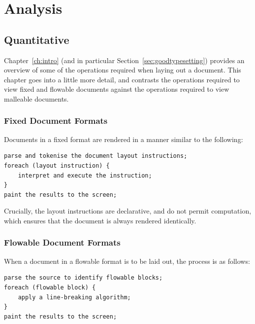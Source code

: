 \chapter{Analysis}\label{ch:analysis}



\section{Quantitative}

Chapter~\ref{ch:intro} (and in particular Section~\ref{sec:goodtypesetting}) provides an overview of some of the operations required when laying out a document. This chapter goes into a little more detail, and contrasts the operations required to view fixed and flowable documents against the operations required to view malleable documents.

\subsection{Fixed Document Formats}
Documents in a fixed format are rendered in a manner similar to the following:
{\singlespacing
\begin{lstlisting}
parse and tokenise the document layout instructions;
foreach (layout instruction) {
    interpret and execute the instruction;
}
paint the results to the screen;
\end{lstlisting}
}
Crucially, the layout instructions are declarative, and do not permit computation, which ensures that the document is always rendered identically.\hspace{0pt}\cite{Bagley2007}

\newpage
\subsection{Flowable Document Formats}

When a document in a flowable format is to be laid out, the process is as follows:
{\singlespacing
\begin{lstlisting}
parse the source to identify flowable blocks;
foreach (flowable block) {
    apply a line-breaking algorithm;
}
paint the results to the screen;
\end{lstlisting}
}

